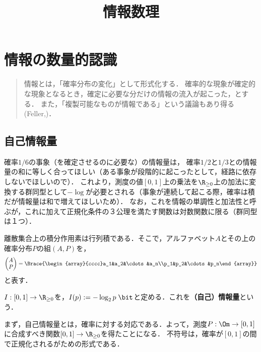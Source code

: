 \documentclass[uplatex,dvipdfmx]{jsreport}
\title{情報数理}
\author{}
\begin{document}
\tableofcontents

\chapter{情報の数量的認識}

\begin{quotation}
    情報とは，「確率分布の変化」として形式化する．
    確率的な現象が確定的な現象となるとき，確定に必要な分だけの情報の流入が起こった，とする．
    また，「複製可能なものが情報である」という議論もあり得る(Feller,\cite{野口悠紀雄})．
\end{quotation}

\section{自己情報量}

\begin{tcolorbox}[colframe=ForestGreen, colback=ForestGreen!10!white,breakable,colbacktitle=ForestGreen!40!white,coltitle=black,fonttitle=\bfseries\sffamily,
title=情報量の形式化の仕方から，対数の登場は必然であった]
    確率$1/6$の事象（を確定させるのに必要な）の情報量は，
    確率$1/2$と$1/3$との情報量の和に等しく合ってほしい（ある事象が段階的に起こったとして，経路に依存しないでほしいので）．
    これより，測度の値$[0,1]$上の乗法を$\R_{\ge0}$上の加法に変換する群同型として$-\log$が必要とされる（事象が連続して起こる際，確率は積だが情報量は和で増えてほしいため）．
    なお，これを情報の単調性と加法性と呼ぶが，これに加えて正規化条件の３公理を満たす関数は対数関数に限る（群同型は１つ）．
\end{tcolorbox}

\begin{notation}
    離散集合上の積分作用素は行列積である．そこで，アルファベット$A$とその上の確率分布$P$の組$(A,P)$を，
    \[\begin{pmatrix}A\\P\end{pmatrix}=\Brace{\begin{array}{cccc}a_1&a_2&\cdots&a_n\\p_1&p_2&\cdots&p_n\end{array}}\]
    と表す．
\end{notation}

\begin{definition}
    $I:[0,1]\to\R_{\ge0}$を，$I(p):=-\log_2p\;\bit$と定める．これを\textbf{（自己）情報量}という．
\end{definition}
\begin{remarks}
    まず，自己情報量とは，確率に対する対応である．よって，測度$P:\Om\to[0,1]$に合成すべき関数$[0,1]\to\R_{\ge0}$を得たことになる．
    不符号は，確率が$[0,1]$の間で正規化されるがための形式である．
\end{remarks}
\end{document}
